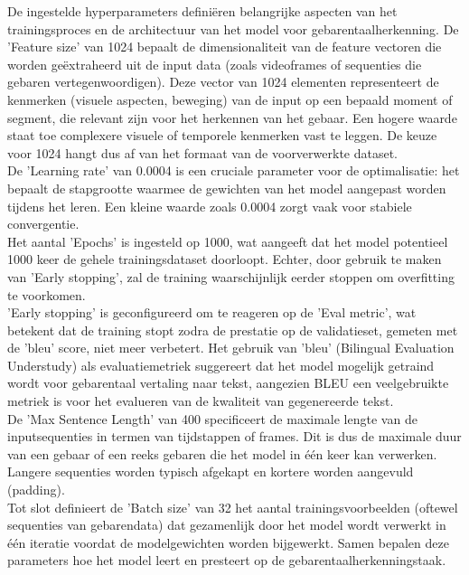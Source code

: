 De ingestelde hyperparameters definiëren belangrijke aspecten van het trainingsproces en de architectuur van het model voor gebarentaalherkenning. 
De 'Feature size' van 1024 bepaalt de dimensionaliteit van de feature vectoren die worden geëxtraheerd uit de input data (zoals videoframes of sequenties die gebaren vertegenwoordigen). 
Deze vector van 1024 elementen representeert de kenmerken (visuele aspecten, beweging) van de input op een bepaald moment of segment, die relevant zijn voor het herkennen van het gebaar. 
Een hogere waarde staat toe complexere visuele of temporele kenmerken vast te leggen.
De keuze voor 1024 hangt dus af van het formaat van de voorverwerkte dataset.
\\
De 'Learning rate' van 0.0004 is een cruciale parameter voor de optimalisatie: het bepaalt de stapgrootte waarmee de gewichten van het model aangepast worden tijdens het leren. 
Een kleine waarde zoals 0.0004 zorgt vaak voor stabiele convergentie.
\\
Het aantal 'Epochs' is ingesteld op 1000, wat aangeeft dat het model potentieel 1000 keer de gehele trainingsdataset doorloopt. 
Echter, door gebruik te maken van 'Early stopping', zal de training waarschijnlijk eerder stoppen om overfitting te voorkomen.
\\
'Early stopping' is geconfigureerd om te reageren op de 'Eval metric', wat betekent dat de training stopt zodra de prestatie op de validatieset, gemeten met de 'bleu' score, niet meer verbetert. 
Het gebruik van 'bleu' (Bilingual Evaluation Understudy) als evaluatiemetriek suggereert dat het model mogelijk getraind wordt voor gebarentaal vertaling naar tekst, aangezien BLEU een veelgebruikte metriek is voor het evalueren van de kwaliteit van gegenereerde tekst.
\\
De 'Max Sentence Length' van 400 specificeert de maximale lengte van de inputsequenties in termen van tijdstappen of frames. 
Dit is dus de maximale duur van een gebaar of een reeks gebaren die het model in één keer kan verwerken. 
Langere sequenties worden typisch afgekapt en kortere worden aangevuld (padding).
\\
Tot slot definieert de 'Batch size' van 32 het aantal trainingsvoorbeelden (oftewel sequenties van gebarendata) dat gezamenlijk door het model wordt verwerkt in één iteratie voordat de modelgewichten worden bijgewerkt. 
Samen bepalen deze parameters hoe het model leert en presteert op de gebarentaalherkenningstaak.

